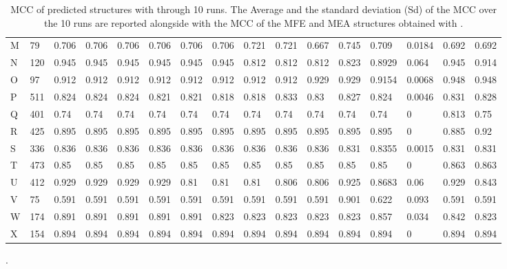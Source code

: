 \documentclass[11pt]{article} %
\begin{document}
\begin{table}[H]
\begin{adjustbox}{max width=1\textwidth,max totalheight=\textheight,keepaspectratio}
\begin{tabular}{llHHHHHHHHHHHlHH}
			M	&	79	&	0.706	&	0.706	&	0.706	&		0.706	&	0.706	&	0.706	&	0.721	&	0.721	&	0.667	&	0.745	&	0.709	&	0.0184	&	0.692	&	0.692	\\
			N	&	120	&	0.945	&	0.945	&	0.945	&		0.945	&	0.945	&	0.945	&	0.812	&	0.812	&	0.812	&	0.823	&	0.8929	&	0.064	&	0.945	&	0.914	\\
			O	&	97	&	0.912	&	0.912	&	0.912	&		0.912	&	0.912	&	0.912	&	0.912	&	0.912	&	0.929	&	0.929	&	0.9154	&	0.0068	&	0.948	&	0.948	\\
			P	&	511	&	0.824	&	0.824	&	0.824	&		0.821	&	0.821	&	0.818	&	0.818	&	0.833	&	0.83	&	0.827	&	0.824	&	0.0046	&	0.831	&	0.828	\\
			Q	&	401	&	0.74	&	0.74	&	0.74	&		0.74	&	0.74	&	0.74	&	0.74	&	0.74	&	0.74	&	0.74	&	0.74	&	0	&	0.813	&	0.75	\\
			R	&	425	&	0.895	&	0.895	&	0.895	&		0.895	&	0.895	&	0.895	&	0.895	&	0.895	&	0.895	&	0.895	&	0.895	&	0	&	0.885	&	0.92	\\
			S	&	336	&	0.836	&	0.836	&	0.836	&		0.836	&	0.836	&	0.836	&	0.836	&	0.836	&	0.836	&	0.831	&	0.8355	&	0.0015	&	0.831	&	0.831	\\
			T	&	473	&	0.85	&	0.85	&	0.85	&		0.85	&	0.85	&	0.85	&	0.85	&	0.85	&	0.85	&	0.85	&	0.85	&	0	&	0.863	&	0.863	\\
			U	&	412	&	0.929	&	0.929	&	0.929	&		0.929	&	0.81	&	0.81	&	0.81	&	0.806	&	0.806	&	0.925	&	0.8683	&	0.06	&	0.929	&	0.843	\\
			V	&	75	&	0.591	&	0.591	&	0.591	&		0.591	&	0.591	&	0.591	&	0.591	&	0.591	&	0.591	&	0.901	&	0.622	&	0.093	&	0.591	&	0.591	\\
			W	&	174	&	0.891	&	0.891	&	0.891	&		0.891	&	0.891	&	0.823	&	0.823	&	0.823	&	0.823	&	0.823	&	0.857	&	0.034	&	0.842	&	0.823	\\
			X	&	154	&	0.894	&	0.894	&	0.894	&		0.894	&	0.894	&	0.894	&	0.894	&	0.894	&	0.894	&	0.894	&	0.894	&	0	&	0.894	&	0.894	\\
			
			
			\bottomrule
		\end{tabular}
	\end{adjustbox}
	\caption{MCC of predicted structures with \OurTool{} through 10 runs. The Average and the standard deviation (Sd) of the MCC over the 10 runs are reported alongside with the MCC of the MFE and MEA structures obtained with .}.
\end{table}

\end{document}
